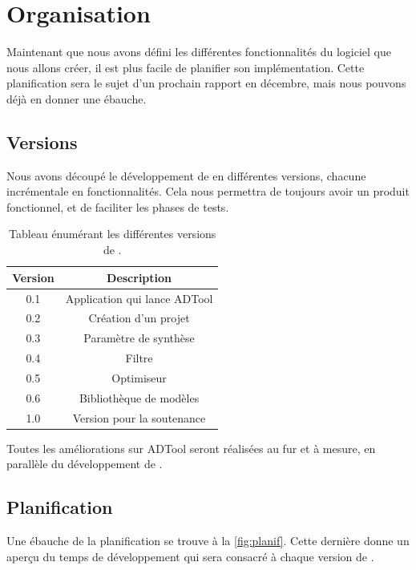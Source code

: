 \section{Organisation}

Maintenant que nous avons défini les différentes fonctionnalités du logiciel que nous allons créer, il est plus facile de planifier son implémentation. Cette planification sera le sujet d'un prochain rapport en décembre, mais nous pouvons déjà en donner une ébauche.

	\subsection{Versions}
		Nous avons découpé le développement de \glasir{} en différentes versions, chacune incrémentale en fonctionnalités. Cela nous permettra de toujours avoir un produit fonctionnel, et de faciliter les phases de tests.

		\begin{table}[h!]
			\begin{center}
			\begin{tabular}{|c|c|}
				\hline
				Version & Description\\
				\hline
				0.1 & Application qui lance ADTool\\
				\hline
				0.2 & Création d'un projet\\
				\hline
				0.3 & Paramètre de synthèse\\
				\hline
				0.4 & Filtre\\
				\hline
				0.5 & Optimiseur\\
				\hline
				0.6 & Bibliothèque de modèles\\
				\hline
				1.0 & Version pour la soutenance\\
				\hline
			\end{tabular}
			\end{center}
			\caption{Tableau énumérant les différentes versions de \glasir{}.}
		\end{table} %

		Toutes les améliorations sur ADTool seront réalisées au fur et à mesure, en parallèle du développement de \glasir{}.

	\subsection{Planification}
		Une ébauche de la planification se trouve à la  \ref{fig:planif}. Cette dernière donne un aperçu du temps de développement qui sera consacré à chaque version de \glasir{}. 

